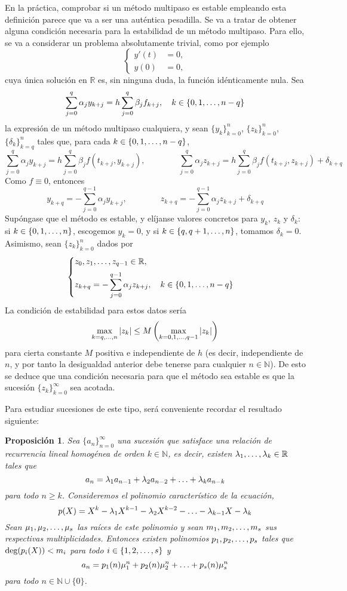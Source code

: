 \documentclass[11pt]{report}
\theoremstyle{mytheorem}
\newtheorem{proposition}{Proposición}
\theoremstyle{mydefinition}
\theoremstyle{myexample}
\newenvironment{cproposition} %
  {\begin{mdframed}[
        linewidth=3pt,
        linecolor=c2,
        bottomline=false,
        topline=false,
        rightline=false,
        innerrightmargin=0pt,
        innertopmargin=0pt,
        innerbottommargin=0pt,
        innerleftmargin=1em, %
        skipabove=\baselineskip]
    \begin{proposition}}
  {\end{proposition}\end{mdframed}}
\newcommand{\R}{\mathbb R}
\newcommand{\N}{\mathbb N}
\begin{document}
En la práctica, comprobar si un método multipaso es estable empleando esta definición parece que va a ser una auténtica pesadilla. Se va a tratar de obtener alguna condición necesaria para la estabilidad de un método multipaso. Para ello, se va a considerar un problema absolutamente trivial, como por ejemplo
\[\left\{\begin{alignedat}{1}
    y'(t)&=0, \\
    y(0)&=0,
\end{alignedat}\right.\]
cuya única solución en $\R$ es, sin ninguna duda, la función idénticamente nula. Sea
\[\sum_{j=0}^{q} \alpha_j y_{k+j} = h\sum_{j=0}^q \beta_j f_{k+j}, \quad k \in \{0,1,\mathellipsis,n-q\}\]
la expresión de un método multipaso cualquiera, y sean $\{y_k\}_{k=0}^n$, $\{z_k\}_{k=0}^n$, $\{\delta_k\}_{k=q}^{n}$ tales que, para cada $k \in \{0,1,\mathellipsis,n-q\}$,
\[\sum_{j=0}^q \alpha_j y_{k+j} = h\sum_{j=0}^q \beta_j f(t_{k+j},y_{k+j}), \qquad \qquad \sum_{j=0}^q \alpha_j z_{k+j} = h\sum_{j=0}^q \beta_j f(t_{k+j},z_{k+j})+\delta_{k+q}\]
Como $f \equiv 0$, entonces
\[y_{k+q} = -\sum_{j=0}^{q-1}\alpha_jy_{k+j}, \qquad \qquad z_{k+q} = -\sum_{j=0}^{q-1}\alpha_jz_{k+j}+\delta_{k+q}\]
Supóngase que el método es estable, y elíjanse valores concretos para $y_k$, $z_k$ y $\delta_k$: si $k \in \{0,1,\mathellipsis,n\}$, escogemos $y_k = 0$, y si $k \in \{q,q+1,\mathellipsis,n\}$, tomamos $\delta_k = 0$. Asimismo, sean $\{z_k\}_{k=0}^n$ dados por
\[\begin{cases}
    z_0,z_1,\mathellipsis,z_{q-1} \in \R, \\[5pt]
    \displaystyle z_{k+q} = -\sum_{j=0}^{q-1}\alpha_jz_{k+j}, \quad k \in \{0,1,\mathellipsis,n-q\}
\end{cases}\]
La condición de estabilidad para estos datos sería
\[\max_{k = q,\mathellipsis,n} |z_k| \leq M\left(\max_{k=0,1,\mathellipsis,q-1}|z_k|\right)\]
para cierta constante $M$ positiva e independiente de $h$ (es decir, independiente de $n$, y por tanto la desigualdad anterior debe tenerse para cualquier $n \in \N$). De esto se deduce que una condición necesaria para que el método sea estable es que la sucesión $\{z_k\}_{k=0}^\infty$ sea acotada.

Para estudiar sucesiones de este tipo, será conveniente recordar el resultado siguiente:

\begin{cproposition}
\label{prop6}
Sea $\{a_n\}_{n=0}^\infty$ una sucesión que satisface una relación de recurrencia lineal homogénea de orden $k \in \N$, es decir, existen $\lambda_1,\mathellipsis,\lambda_k \in \R$ tales que
\[a_n= \lambda_1a_{n-1}+\lambda_2a_{n-2}+\mathellipsis+\lambda_ka_{n-k}\]
para todo $n \geq k$. Consideremos el polinomio característico de la ecuación,
\[p(X) = X^k-\lambda_1X^{k-1}-\lambda_2X^{k-2}-\mathellipsis-\lambda_{k-1}X-\lambda_k\]
Sean $\mu_1,\mu_2,\mathellipsis,\mu_s$ las raíces de este polinomio y sean $m_1,m_2,\mathellipsis,m_s$ sus respectivas multiplicidades. Entonces existen polinomios $p_1,p_2,\mathellipsis,p_s$ tales que $\textup{deg}(p_i(X)) < m_i$ para todo $i \in \{1,2,\mathellipsis,s\}$ y
\[a_n = p_1(n)\mu_1^n+p_2(n)\mu_2^n+\mathellipsis+p_s(n)\mu_s^n\]
para todo $n \in \N \cup \{0\}$.
\end{cproposition}
\end{document}
